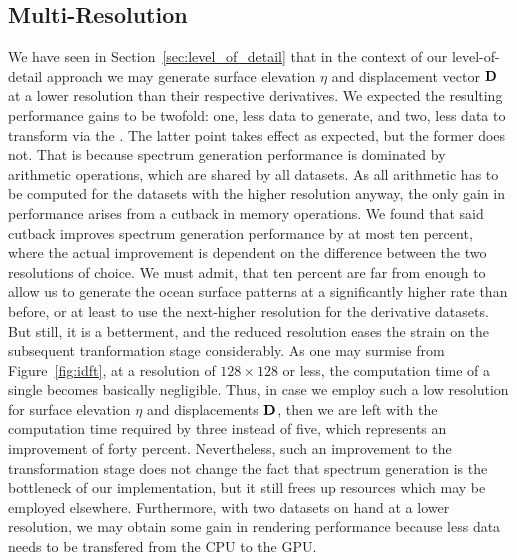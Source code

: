 

%
%
\subsection{Multi-Resolution}
We have seen in Section~\ref{sec:level_of_detail} that in the context of our
level-of-detail approach we may generate surface elevation $\eta$ and
displacement vector $\mathbf{D}$ at a lower resolution than their respective
derivatives. We expected the resulting performance gains to be twofold: one,
less data to generate, and two, less data to transform via the \IDFT.
The latter point takes effect as expected, but the former does not.
That is because spectrum generation performance is
dominated by arithmetic operations, which are shared by all datasets. As all
arithmetic has to be computed for the datasets with the higher resolution
anyway, the only gain in performance arises from a cutback in memory operations.
We found that said cutback improves spectrum generation performance by at most
ten percent, where the actual improvement is dependent on the difference between
the two resolutions of choice. We must admit, that ten percent are far from
enough to allow us to generate the ocean surface patterns at a significantly
higher rate than before, or at least to use the next-higher resolution for the
derivative datasets. But still, it is a betterment, and the reduced resolution
eases the strain on the subsequent tranformation stage considerably.
As one may surmise from Figure~\ref{fig:idft}, at a resolution of $128\times128$
or less, the computation time of a single \IDFT becomes basically negligible.
Thus, in case we employ such a low resolution for surface elevation $\eta$ and
displacements $\mathbf{D}$, then we are left with the computation time required
by three \IDFTs instead of five, which represents an improvement of forty percent.
Nevertheless, such an improvement to the transformation stage does not change
the fact that spectrum generation is the bottleneck of our implementation, but
it still frees up resources which may be employed elsewhere.
Furthermore, with two datasets on hand at a lower resolution, we may obtain some
gain in rendering performance because less data needs to be transfered from the
CPU to the GPU.
